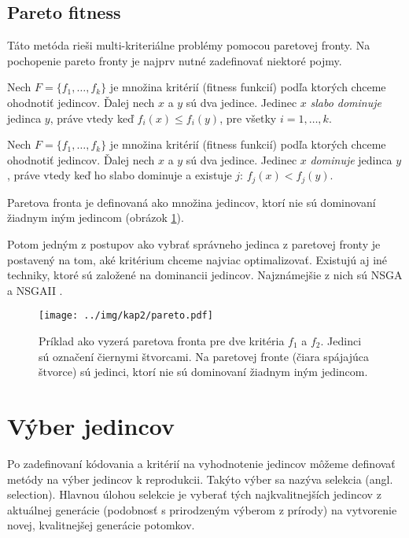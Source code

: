 \subsection{Pareto fitness}\label{kap2:2.3:2.3.3:Pareto}
Táto metóda rieši multi-kriteriálne problémy pomocou paretovej fronty. Na pochopenie pareto fronty je najprv nutné zadefinovať niektoré pojmy.
\begin{def-sk}
Nech $F = \{f_{1}, \ldots, f_{k}\}$ je množina kritérií (fitness funkcií) podľa ktorých chceme ohodnotiť jedincov. Ďalej nech $x$ a $y$ sú dva jedince. Jedinec $x$ \emph{slabo dominuje} jedinca $y$, práve vtedy keď $f_{i}(x) \leq f_{i}(y)$, pre všetky $i = 1,\ldots,k$.
\end{def-sk}
\begin{def-sk}
Nech $F = \{f_{1}, \ldots, f_{k}\}$ je množina kritérií (fitness funkcií) podľa ktorých chceme ohodnotiť jedincov. Ďalej nech $x$ a $y$ sú dva jedince. Jedinec $x$ \emph{dominuje} jedinca $y$, práve vtedy keď ho slabo dominuje a existuje $j$: $f_{j}(x) < f_{j}(y)$.
\end{def-sk}
\begin{def-sk}
Paretova fronta je definovaná ako množina jedincov, ktorí nie sú dominovaní žiadnym iným jedincom (obrázok \ref{fig:Pareto}).
\end{def-sk}
Potom jedným z postupov ako vybrať správneho jedinca z paretovej fronty je postavený na tom, aké kritérium chceme najviac optimalizovať. Existujú aj iné techniky, ktoré sú založené na dominancii jedincov. Najznámejšie z nich sú NSGA a NSGAII \cite{online-NSGA}.

\begin{figure}[h]
\centering
\centerline{\mbox{\texttt{[image: ../img/kap2/pareto.pdf]}}}
\caption{Príklad ako vyzerá paretova fronta pre dve kritéria $f_{1}$ a $f_{2}$. Jedinci sú označení čiernymi štvorcami. Na paretovej fronte (čiara spájajúca štvorce) sú jedinci, ktorí nie sú dominovaní žiadnym iným jedincom.}\label{fig:Pareto}
\end{figure}

\section{Výber jedincov}\label{kap2:2.4:Selection}
Po zadefinovaní kódovania a kritérií na vyhodnotenie jedincov môžeme definovať metódy na výber jedincov k reprodukcii. Takýto výber sa nazýva selekcia (angl. selection). Hlavnou úlohou selekcie je vyberať tých najkvalitnejších jedincov z aktuálnej generácie (podobnosť s prirodzeným výberom z prírody) na vytvorenie novej, kvalitnejšej generácie potomkov.


